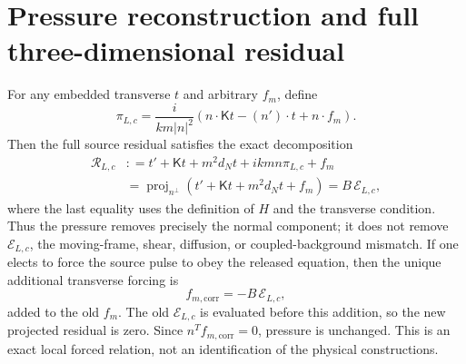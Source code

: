 \documentclass[11pt]{article}
\newcommand{\proj}{\operatorname{proj}}
\begin{document}
\section{Pressure reconstruction and full three-dimensional residual}
For any embedded transverse $t$ and arbitrary $f_m$, define
\begin{equation}
 \pi_{L,c}=\frac{i}{km|n|^2}
 \left(n\cdot\mathsf Kt-(n')\cdot t+n\cdot f_m\right).
 \label{nsbridge:eq:pressuremap}
\end{equation}
Then the full source residual satisfies the exact decomposition
\begin{align}
 \mathcal R_{L,c}
 &: =t'+\mathsf Kt+m^2d_Nt+ikm n\pi_{L,c}+f_m \\
 &=\proj_{n^\perp}\left(t'+\mathsf Kt+m^2d_Nt+f_m\right)
 =B\,\mathcal E_{L,c},
 \label{nsbridge:eq:fullresidual}
\end{align}
where the last equality uses the definition of $H$ and the transverse condition.
Thus the pressure removes precisely the normal component; it does not remove
$\mathcal E_{L,c}$, the moving-frame, shear, diffusion, or coupled-background
mismatch.  If one elects to force the source pulse to obey the released equation,
then the unique additional transverse forcing is
\begin{equation}
 f_{m,\mathrm{corr}}=-B\,\mathcal E_{L,c},
\end{equation}
added to the old $f_m$. The old $\mathcal E_{L,c}$ is evaluated before
this addition, so the new projected residual is zero.
Since $n^Tf_{m,\mathrm{corr}}=0$, pressure is unchanged.
This is an exact local
forced relation, not an identification of the physical constructions.
\end{document}
